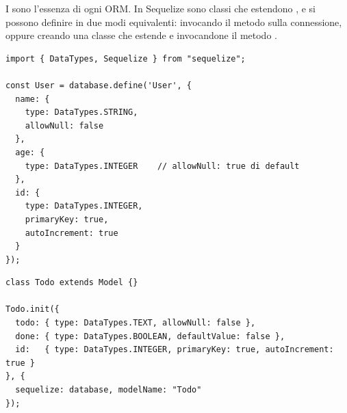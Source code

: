 I  sono l'essenza di ogni ORM. In Sequelize sono classi che
estendono , e si possono definire in due modi equivalenti: invocando
il metodo  sulla connessione, oppure creando una classe che
estende  e invocandone il metodo .

\begin{affianco}[0.55][c]
\begin{lstlisting}[style=js, name=models/User.js]
import { DataTypes, Sequelize } from "sequelize";

const User = database.define('User', {
  name: {
    type: DataTypes.STRING,
    allowNull: false
  },
  age: {
    type: DataTypes.INTEGER    // allowNull: true di default
  },
  id: {
    type: DataTypes.INTEGER,
    primaryKey: true,
    autoIncrement: true
  }
});
\end{lstlisting}
\risultato
\begin{immagine}
\end{immagine}
\end{affianco}

\begin{affianco}[0.58][c]
\codicepiccolo
\begin{lstlisting}[style=js, name=models/Todo.js]
class Todo extends Model {}

Todo.init({
  todo: { type: DataTypes.TEXT, allowNull: false },
  done: { type: DataTypes.BOOLEAN, defaultValue: false },
  id:   { type: DataTypes.INTEGER, primaryKey: true, autoIncrement: true }
}, {
  sequelize: database, modelName: "Todo"
});
\end{lstlisting}
\risultato
\begin{immagine}
\end{immagine}
\end{affianco}

